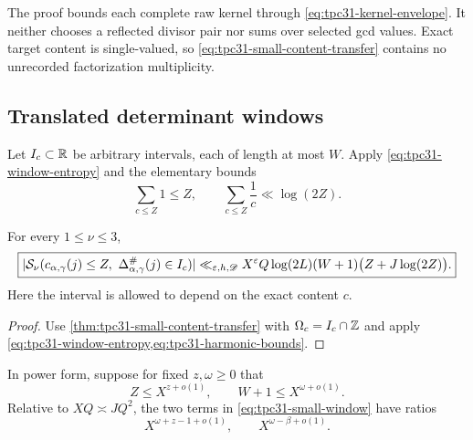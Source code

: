 \begin{remark}
\label{rem:tpc31-no-divisor-multiplicity}
The proof bounds each complete raw kernel through
\eqref{eq:tpc31-kernel-envelope}.  It neither chooses a reflected
divisor pair nor sums over selected gcd values.  Exact target content
is single-valued, so \eqref{eq:tpc31-small-content-transfer} contains
no unrecorded factorization multiplicity.
\end{remark}

\subsection{Translated determinant windows}

Let $I_c\subset\mathbb R$ be arbitrary intervals, each of length at most
$W$.  Apply \eqref{eq:tpc31-window-entropy} and the elementary bounds
\begin{equation}
 \sum_{c\le Z}1\le Z,
 \qquad
 \sum_{c\le Z}\frac1c\ll\log(2Z).
 \label{eq:tpc31-harmonic-bounds}
\end{equation}

\begin{corollary}
\label{cor:tpc31-small-window}
For every $1\le\nu\le3$,
\begin{equation}
 \boxed{
 |\mathcal S_\nu(c_{\alpha,\gamma}(j)\le Z,
            \ \Delta^\#_{\alpha,\gamma}(j)\in I_c)|
 \ll_{\varepsilon,h,\mathscr D}
 X^\varepsilon Q\log(2L)(W+1)
 \bigl(Z+J\log(2Z)\bigr).}
 \label{eq:tpc31-small-window}
\end{equation}
Here the interval is allowed to depend on the exact content $c$.
\end{corollary}

\begin{proof}
Use \cref{thm:tpc31-small-content-transfer} with
$\Omega_c=I_c\cap\mathbb Z$ and apply
\cref{eq:tpc31-window-entropy,eq:tpc31-harmonic-bounds}.
\end{proof}

In power form, suppose for fixed $z,\omega\ge0$ that
\begin{equation}
 Z\le X^{z+o(1)},
 \qquad W+1\le X^{\omega+o(1)}.
 \label{eq:tpc31-window-exponents}
\end{equation}
Relative to $XQ\asymp JQ^2$, the two terms in
\eqref{eq:tpc31-small-window} have ratios
\begin{equation}
 X^{\omega+z-1+o(1)},
 \qquad
 X^{\omega-\beta+o(1)}.
 \label{eq:tpc31-small-window-ratios}
\end{equation}

